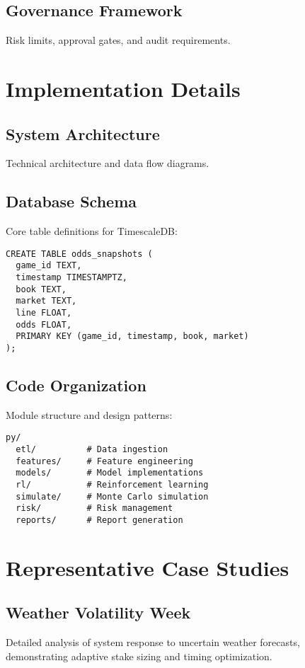 \section{Governance Framework}
Risk limits, approval gates, and audit requirements.

\chapter{Implementation Details}

\section{System Architecture}
Technical architecture and data flow diagrams.

\section{Database Schema}
Core table definitions for TimescaleDB:

\begin{verbatim}
CREATE TABLE odds_snapshots (
  game_id TEXT,
  timestamp TIMESTAMPTZ,
  book TEXT,
  market TEXT,
  line FLOAT,
  odds FLOAT,
  PRIMARY KEY (game_id, timestamp, book, market)
);
\end{verbatim}

\section{Code Organization}
Module structure and design patterns:

\begin{verbatim}
py/
  etl/          # Data ingestion
  features/     # Feature engineering
  models/       # Model implementations
  rl/           # Reinforcement learning
  simulate/     # Monte Carlo simulation
  risk/         # Risk management
  reports/      # Report generation
\end{verbatim}

\chapter{Representative Case Studies}

\section{Weather Volatility Week}
Detailed analysis of system response to uncertain weather forecasts, demonstrating adaptive stake sizing and timing optimization.

